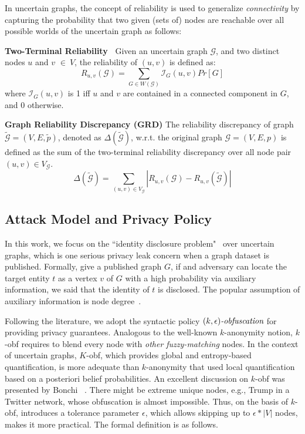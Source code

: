 In uncertain graphs, the concept of reliability is used to generalize \emph{connectivity} by  capturing the probability that two given (sets of) nodes are reachable over all possible worlds of the uncertain graph as follows:
\begin{definition}
    \textbf{Two-Terminal Reliability~\cite{Colbourn_Colbourn_1987}}  Given an uncertain graph $\mathcal{G}$, and two distinct nodes $u$ and $v$  $\in~V$, the reliability of $(u,v)$ is defined as:
        \begin{equation*}
                R_{u,v}(\mathcal{G})= \sum_{G \in W(\mathcal{G})}  \mathcal{I}_{G}(u,v) Pr[G] 
        \end{equation*}
    where $\mathcal{I}_{G}(u,v)$ is 1 iff $u$ and $v$ are contained in a connected component in $G$, and 0 otherwise.   
    \label{d:reliability}
\end{definition}


\theoremstyle{definition}
\begin{definition}
    \textbf{Graph Reliability Discrepancy (GRD)}
    The reliability discrepancy of graph $\tilde{\mathcal{G}}=(V,E, \tilde{\mathit{p}})$, 
    denoted as $\Delta(\tilde{\mathcal{G}})$, 
    w.r.t. the original graph  $\mathcal{G}=(V,E,\mathit{p})$  is 
    defined as the sum of the two-terminal reliability discrepancy over all node pair $(u,v) \in V_\mathcal{G}$.
    \begin{equation*}
        \Delta(\tilde{\mathcal{G}})=\sum_{(u,v) \in V_\mathcal{G} }|R_{u,v}(\mathcal{G})-R_{u,v}(\tilde{\mathcal{G}})|
    \end{equation*}
\end{definition}


\subsection{Attack Model and Privacy Policy}
\label{sec:AMPC}
In this work, we focus on the ``identity disclosure problem"~\cite{Liu_Towards_2008} over uncertain graphs, which is one serious privacy leak concern when a graph dataset is published. Formally, give a published graph $G$, if and adversary can locate the target entity $t$ as a vertex $v$ of $G$ with a high probability via auxiliary information, we said that the identity of $t$ is disclosed. The popular assumption of auxiliary information is node degree~\cite{Liu_Towards_2008}. 

Following the literature, we adopt the syntactic policy $\textit{$(k,\epsilon)$-obfuscation}$ for providing privacy guarantees. 
Analogous to the well-known $k$-anonymity notion, $k$-obf requires to blend every node with \emph{other fuzzy-matching} nodes. 
In the context of uncertain graphs, $K$-obf, which provides global and entropy-based quantification, is more adequate than $k$-anonymity that used local quantification based on a posteriori belief probabilities. An excellent discussion on $k$-obf was presented by Bonchi {\etal}~\cite{Bonchi_Identity_2014}. There might be extreme unique nodes, e.g., Trump in a Twitter network, whose obfuscation is almost impossible. Thus, on the basis of $k$-obf, \cite{Boldi_Injecting_2012} introduces a tolerance parameter $\epsilon$, which allows skipping up to $\epsilon * |V|$ nodes, makes it more practical. The formal definition is as follows. 

